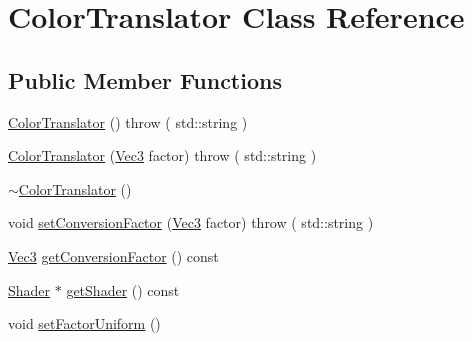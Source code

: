 \hypertarget{classColorTranslator}{
\section{ColorTranslator Class Reference}
\label{classColorTranslator}
}
\subsection*{Public Member Functions}
\begin{DoxyCompactItemize}
\item 
\hyperlink{classColorTranslator_a27ca339a756db56b8ad0cf19b6a9a107}{ColorTranslator} ()  throw ( std::string )
\item 
\hyperlink{classColorTranslator_a88aa857f714fa7f09432a97d9bd89e18}{ColorTranslator} (\hyperlink{structVec3}{Vec3} factor)  throw ( std::string )
\item 
\hyperlink{classColorTranslator_ab89af499b7817dff740652eaf17607fa}{$\sim$ColorTranslator} ()
\item 
void \hyperlink{classColorTranslator_a3d4f90452a337a1752917dfeab1be3f8}{setConversionFactor} (\hyperlink{structVec3}{Vec3} factor)  throw ( std::string )
\item 
\hyperlink{structVec3}{Vec3} \hyperlink{classColorTranslator_a5442cbe5dee3420189c7147c987cb44b}{getConversionFactor} () const 
\item 
\hyperlink{classShader}{Shader} $\ast$ \hyperlink{classColorTranslator_afe0270b9b2920771abf823011aebf0c2}{getShader} () const 
\item 
void \hyperlink{classColorTranslator_a8c2067bfbf7adc6dbe70676fbb2e090f}{setFactorUniform} ()
\end{DoxyCompactItemize}


